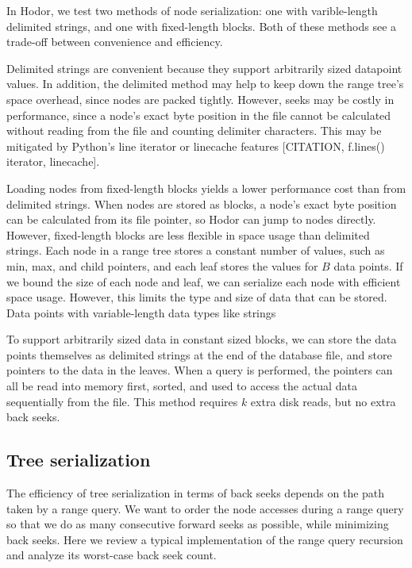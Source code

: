 \documentclass[11pt, oneside]{article}
\begin{document}
In Hodor, we test two methods of node serialization: one with varible-length 
delimited strings, and one with fixed-length blocks. Both of these methods see a
trade-off between convenience and efficiency. 

Delimited strings are convenient because they support arbitrarily sized
datapoint values. In addition, the delimited method may help to keep down the
range tree's space overhead, since nodes are packed tightly. However, seeks may
be costly in performance, since a node's exact byte position in the file cannot
be calculated without reading from the file and counting delimiter characters.
This may be mitigated by Python's line iterator or linecache features
[CITATION, f.lines() iterator, linecache]. 

Loading nodes from fixed-length blocks yields a lower performance cost than
from delimited strings. When nodes are stored as blocks, a node's exact byte
position can be calculated from its file pointer, so Hodor can jump to nodes
directly. However, fixed-length blocks are less flexible in space usage than
delimited strings. Each node in a range tree stores a constant number of
values, such as min, max, and child pointers, and each leaf stores the values
for $B$ data points. If we bound the size of each node and leaf, we can
serialize each node with efficient space usage. However, this limits the type
and size of data that can be stored. Data points with variable-length data types
like strings

To support arbitrarily sized data in constant sized blocks, we can store the
data points themselves as delimited strings at the end of the database file, and
store pointers to the data in the leaves. When a query is performed, the
pointers can all be read into memory first, sorted, and used to access the
actual data sequentially from the file. This method requires $k$ extra disk
reads, but no extra back seeks.


\subsection{Tree serialization}


The efficiency of tree serialization in terms of back seeks depends on the path
taken by a range query. We want to order the node accesses during a range query
so that we do as many consecutive forward seeks as possible, while minimizing
back seeks. Here we review a typical implementation of the range query
recursion and analyze its worst-case back seek count. 
\end{document}
